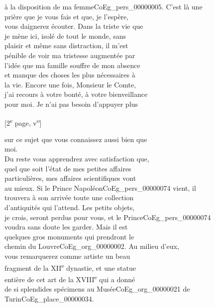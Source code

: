 \documentclass{book}
\begin{document}
à la disposition de ma femme\gls{CoEg_pers_00000005}. C’est là une\\
prière que je vous fais et que, je l’espère,\\
vous daignerez écouter. Dans la triste vie que\\
je mène ici, isolé de tout le monde, sans\\
plaisir et même sans distraction, il m’est\\
pénible de voir ma tristesse augmentée par\\
l’idée que ma famille souffre de mon absence\\
et manque des choses les plus nécessaires à\\
la vie. Encore une fois, Monsieur le Comte,\\
j’ai recours à votre bonté, à votre bienveillance\\
pour moi. Je n’ai pas besoin d’appuyer plus
{\footnotesize \begin{center} [2\textsuperscript{e} page, v\textsuperscript{o}]\end{center}}
\noindent sur ce sujet que vous connaissez aussi bien que\\
moi.\\
\indent Du reste vous apprendrez avec satisfaction que,\\
quel que soit l’état de mes petites affaires\\
particulières, mes affaires scientifiques vont\\
au mieux. Si le Prince Napoléon\gls{CoEg_pers_00000074} vient, il\\
trouvera à son arrivée toute une collection\\
d’antiquités qui l’attend. Les petits objets,\\
je crois, seront perdus pour vous, et le Prince\gls{CoEg_pers_00000074}\\
voudra sans doute les garder. Mais il est\\
quelques gros monuments qui prendront le\\
chemin du Louvre\gls{CoEg_org_00000002}. Au milieu d’eux,\\
vous remarquerez comme artiste un beau\\
fragment de la XII\textsuperscript{e} dynastie, et une statue\\
entière de cet art de la XVIII\textsuperscript{e} qui a donné\\
de si splendides spécimens au Musée\gls{CoEg_org_00000021} de\\
Turin\gls{CoEg_place_00000034}.\\
\end{document}
